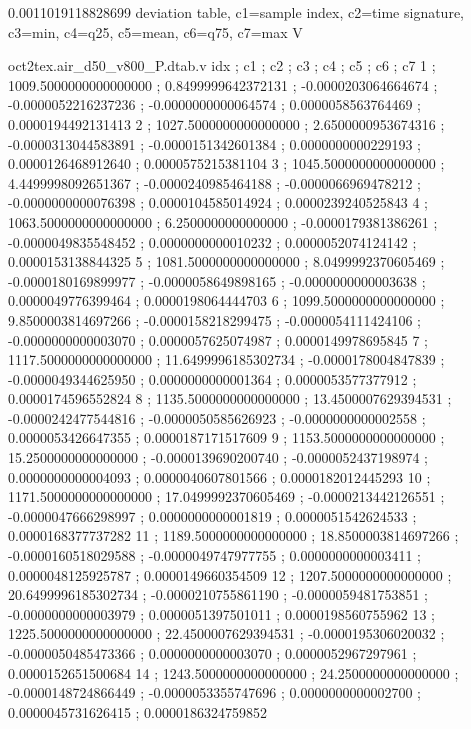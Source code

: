 \expandafter\def\csname oct2tex.air_d50_v800_P.stabmax.v\endcsname{0.0011019118828699}
\expandafter\def\csname oct2tex.air_d50_v800_P.dtab.d\endcsname{deviation table, c1=sample index, c2=time signature, c3=min, c4=q25, c5=mean, c6=q75, c7=max}
\expandafter\def\csname oct2tex.air_d50_v800_P.dtab.u\endcsname{\ensuremath{\text{V}}}
\begin{filecontents}[overwrite]{oct2tex.air_d50_v800_P.dtab.v}
idx ; c1 ; c2 ; c3 ; c4 ; c5 ; c6 ; c7
1 ; 1009.5000000000000000 ; 0.8499999642372131 ; -0.0000203064664674 ; -0.0000052216237236 ; -0.0000000000064574 ; 0.0000058563764469 ; 0.0000194492131413
2 ; 1027.5000000000000000 ; 2.6500000953674316 ; -0.0000313044583891 ; -0.0000151342601384 ; 0.0000000000229193 ; 0.0000126468912640 ; 0.0000575215381104
3 ; 1045.5000000000000000 ; 4.4499998092651367 ; -0.0000240985464188 ; -0.0000066969478212 ; -0.0000000000076398 ; 0.0000104585014924 ; 0.0000239240525843
4 ; 1063.5000000000000000 ; 6.2500000000000000 ; -0.0000179381386261 ; -0.0000049835548452 ; 0.0000000000010232 ; 0.0000052074124142 ; 0.0000153138844325
5 ; 1081.5000000000000000 ; 8.0499992370605469 ; -0.0000180169899977 ; -0.0000058649898165 ; -0.0000000000003638 ; 0.0000049776399464 ; 0.0000198064444703
6 ; 1099.5000000000000000 ; 9.8500003814697266 ; -0.0000158218299475 ; -0.0000054111424106 ; -0.0000000000003070 ; 0.0000057625074987 ; 0.0000149978695845
7 ; 1117.5000000000000000 ; 11.6499996185302734 ; -0.0000178004847839 ; -0.0000049344625950 ; 0.0000000000001364 ; 0.0000053577377912 ; 0.0000174596552824
8 ; 1135.5000000000000000 ; 13.4500007629394531 ; -0.0000242477544816 ; -0.0000050585626923 ; -0.0000000000002558 ; 0.0000053426647355 ; 0.0000187171517609
9 ; 1153.5000000000000000 ; 15.2500000000000000 ; -0.0000139690200740 ; -0.0000052437198974 ; 0.0000000000004093 ; 0.0000040607801566 ; 0.0000182012445293
10 ; 1171.5000000000000000 ; 17.0499992370605469 ; -0.0000213442126551 ; -0.0000047666298997 ; 0.0000000000001819 ; 0.0000051542624533 ; 0.0000168377737282
11 ; 1189.5000000000000000 ; 18.8500003814697266 ; -0.0000160518029588 ; -0.0000049747977755 ; 0.0000000000003411 ; 0.0000048125925787 ; 0.0000149660354509
12 ; 1207.5000000000000000 ; 20.6499996185302734 ; -0.0000210755861190 ; -0.0000059481753851 ; -0.0000000000003979 ; 0.0000051397501011 ; 0.0000198560755962
13 ; 1225.5000000000000000 ; 22.4500007629394531 ; -0.0000195306020032 ; -0.0000050485473366 ; 0.0000000000003070 ; 0.0000052967297961 ; 0.0000152651500684
14 ; 1243.5000000000000000 ; 24.2500000000000000 ; -0.0000148724866449 ; -0.0000053355747696 ; 0.0000000000002700 ; 0.0000045731626415 ; 0.0000186324759852

\end{filecontents}
